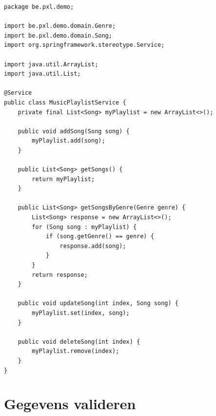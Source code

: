 \begin{lstlisting}
package be.pxl.demo;

import be.pxl.demo.domain.Genre;
import be.pxl.demo.domain.Song;
import org.springframework.stereotype.Service;

import java.util.ArrayList;
import java.util.List;

@Service
public class MusicPlaylistService {
	private final List<Song> myPlaylist = new ArrayList<>();

	public void addSong(Song song) {
		myPlaylist.add(song);
	}

	public List<Song> getSongs() {
		return myPlaylist;
	}

	public List<Song> getSongsByGenre(Genre genre) {
		List<Song> response = new ArrayList<>();
		for (Song song : myPlaylist) {
			if (song.getGenre() == genre) {
				response.add(song);
			}
		}
		return response;
	}

	public void updateSong(int index, Song song) {
		myPlaylist.set(index, song);
	}

	public void deleteSong(int index) {
		myPlaylist.remove(index);
	}
}
\end{lstlisting}


\section{Gegevens valideren}



